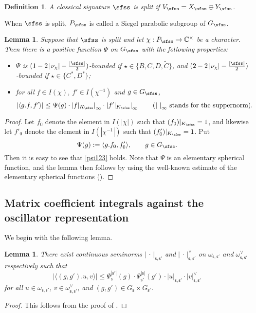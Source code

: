 \documentclass[12pt,a4paper]{amsart}
\def\abs#1{\left|{#1}\right|}
\newcommand{\la}{\langle}
\newcommand{\ra}{\rangle}
\newcommand{\be}{\begin {equation}}
\newcommand{\ee}{\end {equation}}
\numberwithin{equation}{section}
\newtheorem{lem}[thm]{Lemma}
\newtheorem{defn}[thm]{Definition}
\theoremstyle{remark}
\begin{document}
\begin{defn}
A classical signature $\sfss$ is split if $V_\sfss=X_\sfss\oplus Y_\sfss$. 
\end{defn}

When $\sfss$ is split, $P_\sfss$ is called a Siegel parabolic subgroup of $G_\sfss$. 

\begin{lem}\label{growthdp}
Suppose that $\sfss$ is split and let $\chi: P_\sfss\rightarrow \C^\times$ be a character. Then there is a positive function $\Psi$ on $G_\sfss$ with the following properties:
\begin{itemize}
\item
 $\Psi$ is $(1-2\abs{\nu_\chi}-\frac{\abs{\sfss}}{2})$-bounded if $\star\in \{B,C,D, \widetilde C\}$, and  $(2-2\abs{\nu_\chi}-\frac{\abs{\sfss}}{2})$-bounded if $\star\in \{C^*,D^*\}$;
 \item
for all $f\in I(\chi)$, $f'\in I(\chi^{-1})$ and $g\in G_\sfss$, 
\be\label{psi123}
\abs{ \la g.f, f'\ra}\leq \Psi(g) \cdot \abs{f|_{K_\sfss}}_\infty \cdot \abs{f'|_{K_\sfss}}_\infty\qquad(\textrm{$\abs{\,\,}_\infty$ stands for the suppernorm}).
\ee
\end{itemize} 
\end{lem}
\begin{proof}

 Let $f_0$ denote the element in $I(\abs{\chi})$ such that $(f_0)|_{K_\sfss}=1$, and likewise let $f'_0$ denote the element in $I(\abs{\chi^{-1}})$ such that $(f'_0)|_{K_\sfss}=1$. Put
 \[
   \Psi(g):=\la g.f_0, f_0'\ra, \qquad g\in G_\sfss. 
 \]
 Then it is easy to see that \eqref{psi123} holds. Note that $\Psi$ is an elementary spherical function, and the lemma then follows by using the well-known estimate of the elementary spherical functions (\cite[Lemma 3.6.7]{Wa1}).
\end{proof}



\subsection{Matrix coefficient integrals against the oscillator representation}



We begin with the following lemma. 



\begin{lem}\label{matrico}
 There exist continuous seminorms $\abs{\,\cdot\,}_{\mathsf s, \mathsf s'}$ and $\abs{\,\cdot\,}_{\mathsf s, \mathsf s'}^\vee$ on  $ \omega_{\mathsf s, \mathsf s'}$ and $\omega_{\mathsf s, \mathsf s'}^\vee$ respectively such that 
\[
 \abs{ \la (g,g'). u, v\ra}\leq \Psi_{\mathsf s}^{\abs{\mathsf s'}}(g)\cdot \Psi_{\mathsf s'}^{\abs{\mathsf s}}(g')\cdot \abs{u}_{\mathsf s, \mathsf s'}\cdot \abs{v}_{\mathsf s, \mathsf s'}^\vee 
\]
for all $u\in \omega_{\mathsf s, \mathsf s'}$, $v\in \omega_{\mathsf s, \mathsf s'}^\vee$, and $(g,g')\in G_{\mathsf s}\times G_{\mathsf s'}$. 
\end{lem}
\begin{proof}
  This follows from the  proof of \cite[Theorem 3.2]{Li89}.
\end{proof}
\end{document}
